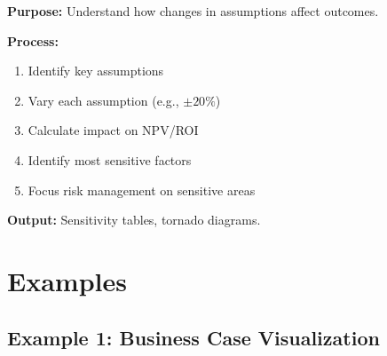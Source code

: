 \documentclass[11pt,letterpaper]{article}
\begin{document}
\begin{definitionbox}
\textbf{Purpose:} Understand how changes in assumptions affect outcomes.

\textbf{Process:}
\begin{enumerate}[nosep]
    \item Identify key assumptions
    \item Vary each assumption (e.g., $\pm 20\%$)
    \item Calculate impact on NPV/ROI
    \item Identify most sensitive factors
    \item Focus risk management on sensitive areas
\end{enumerate}

\textbf{Output:} Sensitivity tables, tornado diagrams.
\end{definitionbox}

\section{Examples}

\subsection{Example 1: Business Case Visualization}
\end{document}
